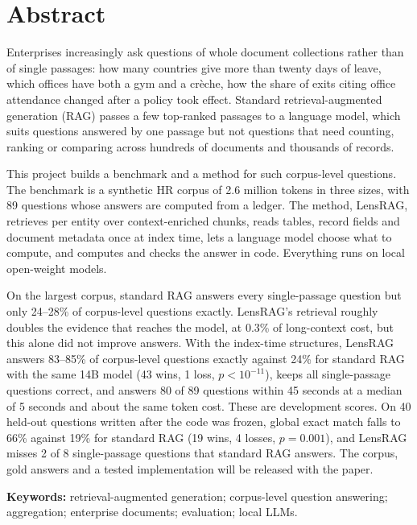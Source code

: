 \documentclass[11pt,letterpaper,oneside]{report}
\begin{document}

\chapter*{Abstract}
Enterprises increasingly ask questions of whole document collections rather
than of single passages: how many countries give more than twenty days of
leave, which offices have both a gym and a crèche, how the share of exits
citing office attendance changed after a policy took effect. Standard
retrieval-augmented generation (RAG) passes a few top-ranked passages to a
language model, which suits questions answered by one passage but not
questions that need counting, ranking or comparing across hundreds of
documents and thousands of records.

This project builds a benchmark and a method for such corpus-level
questions. The benchmark is a synthetic HR corpus of 2.6 million tokens in
three sizes, with 89 questions whose answers are computed from a ledger. The
method, LensRAG, retrieves per entity over context-enriched chunks, reads
tables, record fields and document metadata once at index time, lets a
language model choose what to compute, and computes and checks the answer in
code. Everything runs on local open-weight models.

On the largest corpus, standard RAG answers every single-passage question
but only 24--28\% of corpus-level questions exactly. LensRAG's retrieval
roughly doubles the evidence that reaches the model, at 0.3\% of
long-context cost, but this alone did not improve answers. With the
index-time structures, LensRAG answers 83--85\% of corpus-level questions
exactly against 24\% for standard RAG with the same 14B model (43 wins, 1
loss, $p<10^{-11}$), keeps all single-passage questions correct, and answers
80 of 89 questions within 45 seconds at a median of 5 seconds and about the
same token cost. These are development scores. On 40 held-out questions
written after the code was frozen, global exact match falls to 66\% against
19\% for standard RAG (19 wins, 4 losses, $p=0.001$), and LensRAG misses 2 of
8 single-passage questions that standard RAG answers. The corpus, gold
answers and a tested implementation will be released with the paper.

\vspace{1em}
\noindent\textbf{Keywords:} retrieval-augmented generation; corpus-level question answering; aggregation; enterprise documents; evaluation; local LLMs.
\end{document}

